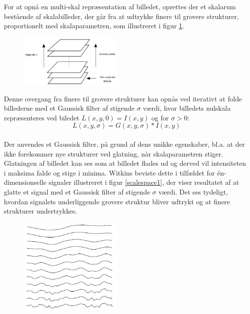 For at opnå en multi-skal repræsentation af billedet, oprettes der et skalarum bestående af skalabilleder, der går fra at udtrykke finere til grovere strukturer, proportionelt med skalaparametren, som illustreret i figur \ref{fig:scalerep}. 
\begin{figure}[H]
    \centering
    \includegraphics[width=0.45\textwidth]{fig/32.png}
     \vspace{-1em}
    \begin{center}    
       \caption{\textcolor{gray}{\footnotesize \textit{ }}}
    \label{fig:scalerep}
     \end{center}
     \vspace{-2.5em}
  \end{figure} \noindent
Denne overgang fra finere til grovere strukturer kan opnås ved iterativt at folde billederne med et Gaussisk filter af stigende $\sigma$ værdi, hvor billedets nulskala repræsenteres ved biledet $ L(x,y,0) = I(x,y)$ og for $\sigma>0$:
\begin{equation}
L(x,y,\sigma) = G(x,y,\sigma)\ast I(x,y)
\label{scalespace1}
\end{equation}
\\
Der anvendes et Gaussisk filter, på grund af dens unikke egenskaber,  bl.a. at der ikke forekommer nye strukturer ved glatning, når skalaparametren stiger. Glatningen af billedet kan ses som at billedet flades ud og derved vil intensiteten i maksima falde og stige i minima.  Witkins \cite{witkins} beviste dette i tilfældet for én-dimensionselle signaler illustreret i  figur  \ref{scalespace1}, der viser resultatet af at glatte et signal med et Gaussisk filter af stigende $\sigma$ værdi. Det ses tydeligt, hvordan signalets underliggende grovere struktur bliver udtrykt og at finere strukturer undertrykkes.
\begin{figure}[H]
    \centering
    \includegraphics[width=0.45\textwidth]{fig/33.png}
     \vspace{-1em}
    \begin{center}    
       \caption{\textcolor{gray}{\footnotesize \textit{ }}}
    \label{fig:scalereps}
     \end{center}
     \vspace{-2.5em}
  \end{figure} \noindent
